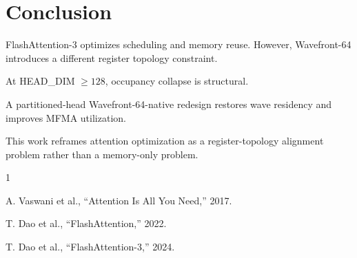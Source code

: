 \documentclass[conference]{IEEEtran}
\begin{document}
\section{Conclusion}

FlashAttention-3 optimizes scheduling and memory reuse.
However, Wavefront-64 introduces a different register topology constraint.

At HEAD\_DIM $\ge 128$, occupancy collapse is structural.

A partitioned-head Wavefront-64-native redesign restores wave residency and improves MFMA utilization.

This work reframes attention optimization as a register-topology alignment problem rather than a memory-only problem.


\begin{thebibliography}{1}

A. Vaswani et al., ``Attention Is All You Need,'' 2017.

T. Dao et al., ``FlashAttention,'' 2022.

T. Dao et al., ``FlashAttention-3,'' 2024.

\end{thebibliography}
\end{document}
